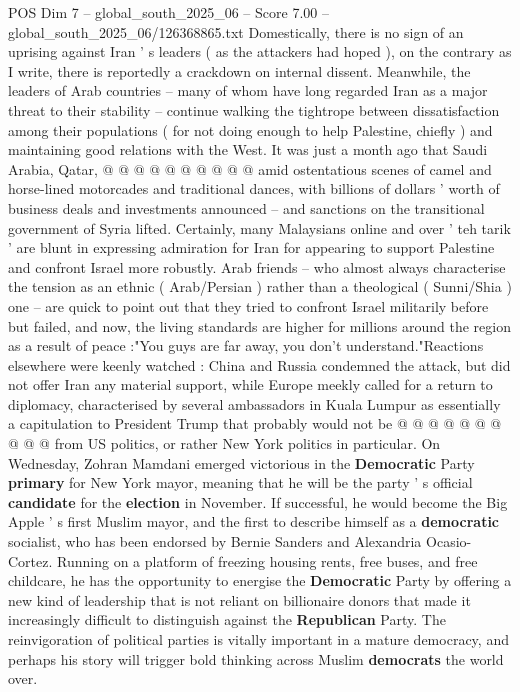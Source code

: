 \begin{textsample}{POS Dim 7 – global\_south\_2025\_06 – Score 7.00 – global\_south\_2025\_06/126368865.txt}
Domestically, there is no sign of an uprising against Iran ' s leaders ( as the attackers had hoped ), on the contrary as I write, there is reportedly a crackdown on internal dissent.
Meanwhile, the leaders of Arab countries -- many of whom have long regarded Iran as a major threat to their stability -- continue walking the tightrope between dissatisfaction among their populations ( for not doing enough to help Palestine, chiefly ) and maintaining good relations with the West.
It was just a month ago that Saudi Arabia, Qatar, @ @ @ @ @ @ @ @ @ @ amid ostentatious scenes of camel and horse-lined motorcades and traditional dances, with billions of dollars ' worth of business deals and investments announced -- and sanctions on the transitional government of Syria lifted.
Certainly, many Malaysians online and over ' teh tarik ' are blunt in expressing admiration for Iran for appearing to support Palestine and confront Israel more robustly.
Arab friends -- who almost always characterise the tension as an ethnic ( Arab/Persian ) rather than a theological ( Sunni/Shia ) one -- are quick to point out that they tried to confront Israel militarily before but failed, and now, the living standards are higher for millions around the region as a result of peace :"You guys are far away, you don't understand."Reactions elsewhere were keenly watched : China and Russia condemned the attack, but did not offer Iran any material support, while Europe meekly called for a return to diplomacy, characterised by several ambassadors in Kuala Lumpur as essentially a capitulation to President Trump that probably would not be @ @ @ @ @ @ @ @ @ @ from US politics, or rather New York politics in particular.
On Wednesday, Zohran Mamdani emerged victorious in the \textbf{Democratic} Party \textbf{primary} for New York mayor, meaning that he will be the party ' s official \textbf{candidate} for the \textbf{election} in November.
If successful, he would become the Big Apple ' s first Muslim mayor, and the first to describe himself as a \textbf{democratic} socialist, who has been endorsed by Bernie Sanders and Alexandria Ocasio-Cortez.
Running on a platform of freezing housing rents, free buses, and free childcare, he has the opportunity to energise the \textbf{Democratic} Party by offering a new kind of leadership that is not reliant on billionaire donors that made it increasingly difficult to distinguish against the \textbf{Republican} Party.
The reinvigoration of political parties is vitally important in a mature democracy, and perhaps his story will trigger bold thinking across Muslim \textbf{democrats} the world over.

\end{textsample}
